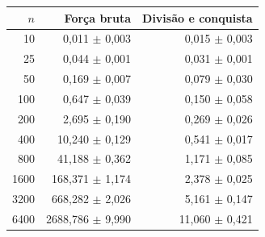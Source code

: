 \begin{tabular}{rrr}
\toprule
$n$ & Força bruta & Divisão e conquista \\
\midrule
10 & 0,011 $\pm$ 0,003 & 0,015 $\pm$ 0,003 \\
25 & 0,044 $\pm$ 0,001 & 0,031 $\pm$ 0,001 \\
50 & 0,169 $\pm$ 0,007 & 0,079 $\pm$ 0,030 \\
100 & 0,647 $\pm$ 0,039 & 0,150 $\pm$ 0,058 \\
200 & 2,695 $\pm$ 0,190 & 0,269 $\pm$ 0,026 \\
400 & 10,240 $\pm$ 0,129 & 0,541 $\pm$ 0,017 \\
800 & 41,188 $\pm$ 0,362 & 1,171 $\pm$ 0,085 \\
1600 & 168,371 $\pm$ 1,174 & 2,378 $\pm$ 0,025 \\
3200 & 668,282 $\pm$ 2,026 & 5,161 $\pm$ 0,147 \\
6400 & 2688,786 $\pm$ 9,990 & 11,060 $\pm$ 0,421 \\
\bottomrule
\end{tabular}
